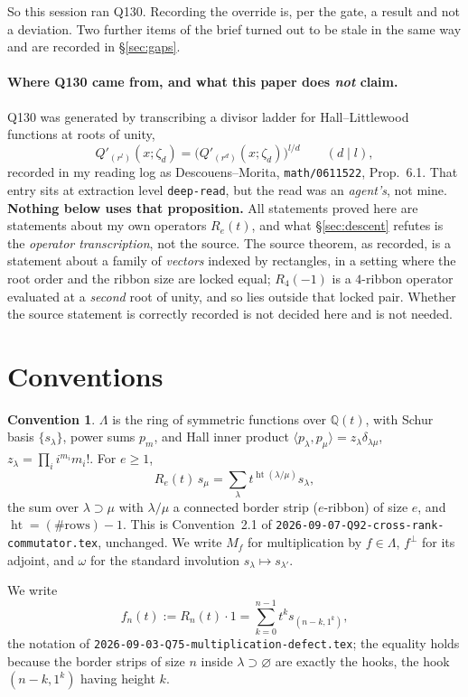 \documentclass[11pt]{article}
\theoremstyle{definition}
\newtheorem{convention}[theorem]{Convention}
\newcommand{\hgt}{\operatorname{ht}}   %
\newcommand{\Q}{\mathbb{Q}}
\newcommand{\Lam}{\Lambda}
\newcommand{\Mult}[1]{M_{#1}}
\begin{document}
So this session ran Q130.  Recording the override is, per the gate, a result and not a
deviation.  Two further items of the brief turned out to be stale in the same way and are
recorded in \S\ref{sec:gaps}.

\paragraph{Where Q130 came from, and what this paper does \emph{not} claim.}
Q130 was generated by transcribing a divisor ladder for Hall--Littlewood functions at roots
of unity,
\[
  Q'_{(r^{l})}(x;\zeta_d)=\bigl(Q'_{(r^{d})}(x;\zeta_d)\bigr)^{l/d}\qquad (d\mid l),
\]
recorded in my reading log as Descouens--Morita, \texttt{math/0611522}, Prop.~6.1.  That entry
sits at extraction level \texttt{deep-read}, but the read was an \emph{agent's}, not mine.
\textbf{Nothing below uses that proposition.}  All statements proved here are statements about
my own operators $R_e(t)$, and what \S\ref{sec:descent} refutes is the \emph{operator
transcription}, not the source.  The source theorem, as recorded, is a statement about a
family of \emph{vectors} indexed by rectangles, in a setting where the root order and the
ribbon size are locked equal; $R_4(-1)$ is a $4$-ribbon operator evaluated at a \emph{second}
root of unity, and so lies outside that locked pair.  Whether the source statement is
correctly recorded is not decided here and is not needed.

\section{Conventions}

\begin{convention}\label{conv:main}
$\Lam$ is the ring of symmetric functions over $\Q(t)$, with Schur basis $\{s_\lambda\}$,
power sums $p_m$, and Hall inner product $\langle p_\lambda,p_\mu\rangle=z_\lambda\delta_{\lambda\mu}$,
$z_\lambda=\prod_i i^{m_i}m_i!$.  For $e\ge1$,
\[
  R_e(t)\,s_\mu=\sum_{\lambda}t^{\hgt(\lambda/\mu)}s_\lambda,
\]
the sum over $\lambda\supset\mu$ with $\lambda/\mu$ a connected border strip ($e$-ribbon) of
size $e$, and $\hgt=(\#\text{rows})-1$.  This is Convention~2.1 of
\texttt{2026-09-07-Q92-cross-rank-commutator.tex}, unchanged.  We write $\Mult{f}$ for
multiplication by $f\in\Lam$, $f^{\perp}$ for its adjoint, and $\omega$ for the standard
involution $s_\lambda\mapsto s_{\lambda'}$.

We write
\[
  f_n(t):=R_n(t)\cdot 1=\sum_{k=0}^{n-1}t^{k}s_{(n-k,1^{k})},
\]
the notation of \texttt{2026-09-03-Q75-multiplication-defect.tex}; the equality holds because
the border strips of size $n$ inside $\lambda\supset\varnothing$ are exactly the hooks, the
hook $(n-k,1^k)$ having height $k$.
\end{convention}
\end{document}
